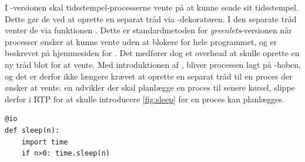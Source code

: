 I -versionen skal tidsstempel-processerne vente på at kunne sende sit tidsstempel. Dette gør de ved at oprette en separat tråd  via -dekoratøren. I den separate tråd venter de via funktionen . Dette er standardmetoden for \emph{greenlets}-versionen når processer ønsker at kunne vente uden at blokere for hele programmet, og er beskrevet på  hjemmesiden for \pycsp. Det medfører dog et overhead at skulle oprette en ny tråd blot for at vente.  Med introduktionen af , bliver processen lagt på -hoben, og det er derfor ikke længere krævet at oprette en separat tråd til en proces der ønsker at vente. en udvikler der skal planlægge en proces til senere kørsel, slippe derfor i RTP for at skulle introducere \cref{fig:sleep} før en proces kan planlægges.

\begin{lstlisting}[firstnumber=1 ,float=hbtp, label=fig:sleep, caption=Funktion der venter et antal sekunder]
@io
def sleep(n):
    import time
    if n>0: time.sleep(n)
\end{lstlisting}
 
